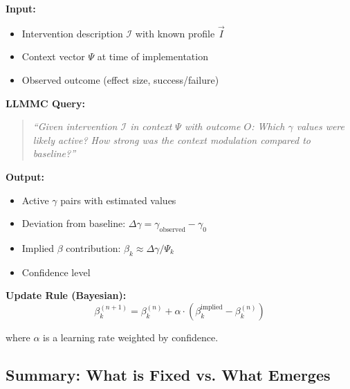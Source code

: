 \begin{tcolorbox}[colback=yellow!5!white, colframe=yellow!75!black,
    title=\textbf{EIT-EMP-1-P1: LLMMC Protocol for Sensitivity Estimation}]

\textbf{Input:}
\begin{itemize}[nosep]
    \item Intervention description $\mathcal{I}$ with known profile $\vec{I}$
    \item Context vector $\Psi$ at time of implementation
    \item Observed outcome (effect size, success/failure)
\end{itemize}

\textbf{LLMMC Query:}
\begin{quote}
\textit{``Given intervention $\mathcal{I}$ in context $\Psi$ with outcome $O$: Which $\gamma$ values were likely active? How strong was the context modulation compared to baseline?''}
\end{quote}

\textbf{Output:}
\begin{itemize}[nosep]
    \item Active $\gamma$ pairs with estimated values
    \item Deviation from baseline: $\Delta\gamma = \gamma_{\text{observed}} - \gamma_0$
    \item Implied $\beta$ contribution: $\beta_k \approx \Delta\gamma / \Psi_k$
    \item Confidence level
\end{itemize}

\textbf{Update Rule (Bayesian):}
\begin{equation}
\beta_k^{(n+1)} = \beta_k^{(n)} + \alpha \cdot (\beta_k^{\text{implied}} - \beta_k^{(n)})
\end{equation}

where $\alpha$ is a learning rate weighted by confidence.

\end{tcolorbox}

\subsection{Summary: What is Fixed vs. What Emerges}
\label{subsec:emp1-summary}

